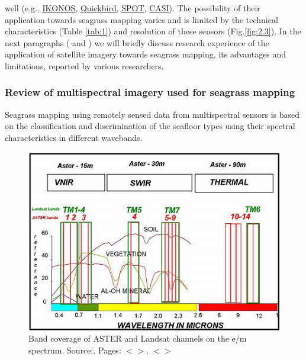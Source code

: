 \documentclass[11pt]{article}
\begin{document}
well (e.g., \href{http://www.satimagingcorp.com/gallery-ikonos.html}{IKONOS}, \href{http://www.digitalglobe.com/index.php/85/QuickBird}{Quickbird}, \href{http://www.spotimage.fr/}{SPOT}, \href{http://www.itres.com/products/imagers/casi550}{CASI}). The possibility of their application towards seagrass mapping varies and is limited by the technical characteristics (Table \ref{tab:1}) and resolution of these sensors  (Fig.\ref{fig:2.3}).
In the next paragraphs ( and ) we will briefly discuss research experience of the application of satellite imagery towards seagrass mapping, its advantages and limitations, reported by various researchers.

\subsubsection[Review of multispectral imagery...]{Review of multispectral imagery used for seagrass mapping}\label{sec:2.4.1} 
Seagrass mapping using remotely sensed data\label{page-18} from multispectral sensors is based on the classification
and discrimination of the seafloor types using their spectral characteristics in different wavebands.

\begin{figure}
	\centering
	\includegraphics[scale=0.35]{Fig-13.jpg}
 	\caption{Band coverage of ASTER and Landsat channels on the e/m spectrum. Source:\cite{Kalinowski04}\label{Kalinowski04}. Pages: $<$\pageref{page-18}$>$, $<$\pageref{page-19}$>$}
	\label{fig:2.4}
\end{figure}
\end{document}
